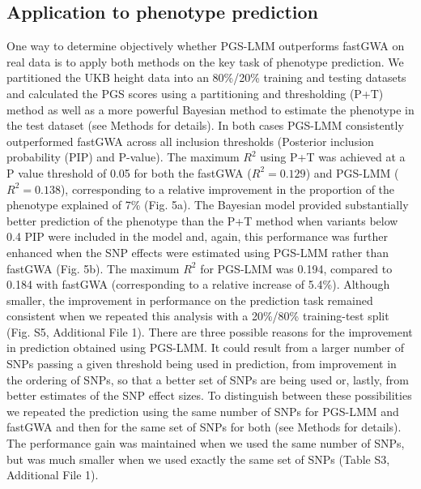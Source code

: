 \documentclass[doublespacing]{bmcart}
\begin{document}
\subsection*{Application to phenotype prediction }
One way to determine objectively whether PGS-LMM outperforms fastGWA on real data is to apply both methods on the key task of phenotype prediction. We partitioned the UKB height data into an 80\%/20\% training and testing datasets and calculated the PGS scores using a partitioning and thresholding (P+T) method as well as a more powerful Bayesian method to estimate the phenotype in the test dataset (see Methods for details).  In both cases PGS-LMM consistently outperformed fastGWA across all inclusion thresholds (Posterior inclusion probability (PIP) and P-value).  The maximum $R^2$ using P+T was achieved at a P value threshold of 0.05 for both the fastGWA ($R^2= 0.129$) and PGS-LMM ($R^2= 0.138$), corresponding to a relative improvement in the proportion of the phenotype explained of 7\% (Fig. 5a). The Bayesian model provided substantially better prediction of the phenotype than the P+T method when variants below 0.4 PIP were included in the model and, again, this performance was further enhanced when the SNP effects were estimated using PGS-LMM rather than fastGWA (Fig. 5b). The maximum $R^2$ for PGS-LMM was 0.194, compared to 0.184 with fastGWA (corresponding to a relative increase of 5.4\%). Although smaller, the improvement in performance on the prediction task remained consistent when we repeated this analysis with a 20\%/80\% training-test split (Fig. S5, Additional File 1). There are three possible reasons for the improvement in prediction obtained using PGS-LMM. It could result from a larger number of SNPs passing a given threshold being used in prediction, from improvement in the ordering of SNPs, so that a better set of SNPs are being used or, lastly, from better estimates of the SNP effect sizes. To distinguish between these possibilities we repeated the prediction using the same number of SNPs for PGS-LMM and fastGWA and then for the same set of SNPs for both (see Methods for details). The performance gain was maintained when we used the same number of SNPs, but was much smaller when we used exactly the same set of SNPs (Table S3, Additional File 1). 
\end{document}
